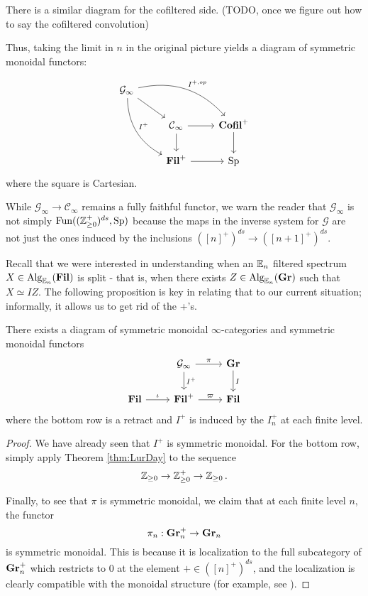 There is a similar diagram for the cofiltered side. (TODO, once we figure out how to say the cofiltered convolution) %

Thus, taking the limit in $n$ in the original picture yields a diagram of symmetric monoidal functors:

$$%
\begin{tikzcd}
\mathcal{G}_\infty
 \arrow[drr, bend left, "I^{+,op}"]
  \arrow[ddr, bend right, "I^+"]
  \arrow[dr] & & \\
&\C_\infty \arrow[r] \arrow[d]&  \Cofil^+ \arrow[d]\\
& \Fil^+ \arrow[r]& \Sp
\end{tikzcd}
$$
where the square is Cartesian.

\begin{rmk}
While $\mathcal{G}_\infty \to \mathcal{C}_\infty$ remains a fully faithful functor, we warn the reader that $\mathcal{G}_\infty$ is not simply $\operatorname{\text{Fun}}((\operatorname{\mathbb{Z}}_{\geq 0}^+)^{ds}, \operatorname{\text{Sp}})$ because the maps in the inverse system for $\mathcal{G}$ are not just the ones induced by the inclusions $([n]^+)^{ds} \to ([n+1]^+)^{ds}.$
\end{rmk}


Recall that we were interested in understanding when an $\operatorname{\mathbb{E}}_n$ filtered spectrum $X\in \operatorname{\text{Alg}}_{\operatorname{\mathbb{E}}_n}(\operatorname{\textbf{Fil}})$ is split - that is, when there exists $Z\in \operatorname{\text{Alg}}_{\operatorname{\mathbb{E}}_n}(\operatorname{\textbf{Gr}})$ such that $X \simeq IZ.$  The following proposition is key in relating that to our current situation; informally, it allows us to get rid of the +'s.

\begin{prop}\label{prop:MonRet}
There exists a diagram of symmetric monoidal $\infty$-categories and symmetric monoidal functors 
$$
\begin{tikzcd}
&\mathcal{G}_\infty \arrow[r,"\pi"] \arrow[d, "I^+"]&  \Gr \arrow[d, "I"]\\
\Fil \arrow[r,"\iota"] & \Fil^+ \arrow[r,"\varpi"]& \Fil
\end{tikzcd}
$$
where the bottom row is a retract and $I^+$ is induced by the $I_n^+$ at each finite level.  
\end{prop} 
\begin{proof}
We have already seen that $I^+$ is symmetric monoidal.  For the bottom row, simply apply Theorem \ref{thm:LurDay} to the sequence $$\operatorname{\mathbb{Z}}_{\geq 0} \to \operatorname{\mathbb{Z}}_{\geq 0}^+ \to \operatorname{\mathbb{Z}}_{\geq 0}.$$

Finally, to see that $\pi$ is symmetric monoidal, we claim that at each finite level $n$, the functor $$\pi_n: \operatorname{\textbf{Gr}}_n^+ \to \operatorname{\textbf{Gr}}_n$$ is symmetric monoidal.  This is because it is localization to the full subcategory of $\operatorname{\textbf{Gr}}_n^+$ which restricts to $0$ at the element $+\in ([n]^+)^{ds}$, and the localization is clearly compatible with the monoidal structure (for example, see \cite[Proposition 2.2.1.9]{HA}).%



\end{proof}


